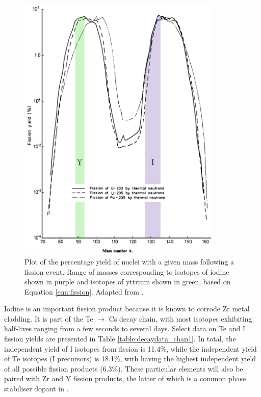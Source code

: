 
\begin{figure}[htp]
\centering
\includegraphics[height=13cm]{images/fissionyield.jpg}
\caption[Plot of the percentage yield of nuclei with a given mass following a fission event. Range of masses corresponding to isotopes of iodine shown in purple and isotopes of yttrium shown in green, based on Equation \ref{eqn:fission}.]{Plot of the percentage yield of nuclei with a given mass following a fission event. Range of masses corresponding to isotopes of iodine shown in purple and isotopes of yttrium shown in green, based on Equation \ref{eqn:fission}. Adapted from \cite{England1992}.}
\label{figure:fissionyield}
\end{figure}

Iodine is an important fission product because it is known to corrode Zr metal cladding. It is part of the Te $\rightarrow$ Cs decay chain, with most isotopes exhibiting half-lives ranging from a few seconds to several days. Select data on Te and I fission yields are presented in Table \ref{table:decaydata_chap1}. In total, the independent yield of I isotopes from fission is 11.4\%, while the independent yield of Te isotopes (I precursors) is 18.1\%, with  having the highest independent yield of all possible fission products (6.3\%). These particular elements will also be paired with Zr and Y fission products, the latter of which is a common phase stabiliser dopant in \zirconia .

